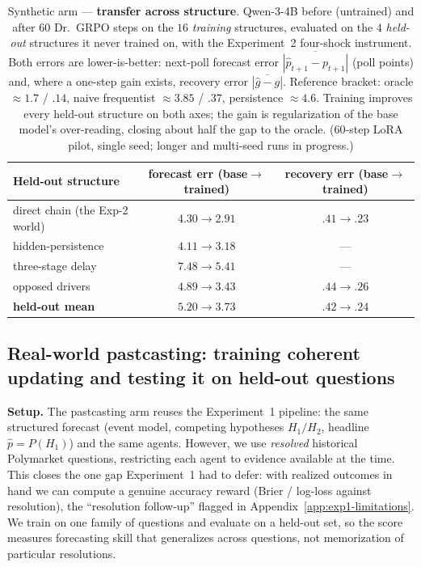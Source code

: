 \documentclass{article} %
\begin{document}
\begin{table}[h]
\centering
\caption{Synthetic arm --- \textbf{transfer across structure}.  Qwen-3-4B before (untrained) and after
$60$ Dr.\ GRPO steps on the $16$ \emph{training} structures, evaluated on the $4$ \emph{held-out}
structures it never trained on, with the Experiment~2 four-shock instrument.  Both errors are
lower-is-better: next-poll forecast error $\overline{|\hat p_{t+1}-p_{t+1}|}$ (poll points) and, where a
one-step gain exists, recovery error $\overline{|\hat g-g|}$.  Reference bracket: oracle $\approx1.7$ /
$.14$, naive frequentist $\approx3.85$ / $.37$, persistence $\approx4.6$.  Training improves every
held-out structure on both axes; the gain is regularization of the base model's over-reading, closing
about half the gap to the oracle. ($60$-step LoRA pilot, single seed; longer and multi-seed runs in
progress.)}
\label{tab:exp3-transfer}
\footnotesize
\begin{tabular}{l cc}
\toprule
Held-out structure & forecast err (base$\to$trained) & recovery err (base$\to$trained) \\
\midrule
direct chain (the Exp-2 world)        & $4.30 \to 2.91$ & $.41 \to .23$ \\
hidden-persistence                    & $4.11 \to 3.18$ & --- \\
three-stage delay                     & $7.48 \to 5.41$ & --- \\
opposed drivers                       & $4.89 \to 3.43$ & $.44 \to .26$ \\
\midrule
\textbf{held-out mean}                & $\mathbf{5.20 \to 3.73}$ & $\mathbf{.42 \to .24}$ \\
\bottomrule
\end{tabular}
\end{table}


\subsection{Real-world pastcasting: training coherent updating and testing it on held-out questions}
\label{sec:exp3-pastcasting}


\textbf{Setup.}  The pastcasting arm reuses the Experiment~1 pipeline: the same structured forecast (event model, competing hypotheses $H_1/H_2$, headline $\hat p = P(H_1)$) and the same agents. However, we use \emph{resolved} historical Polymarket questions, restricting each agent to evidence available at the time.
This closes the one gap Experiment~1 had to defer: with realized outcomes in hand we can compute a genuine accuracy reward (Brier / log-loss against resolution), the ``resolution follow-up'' flagged in Appendix~\ref{app:exp1-limitations}.
We train on one family of questions and evaluate on a held-out set, so the score measures forecasting skill that generalizes across questions, not memorization of particular resolutions.
\end{document}
